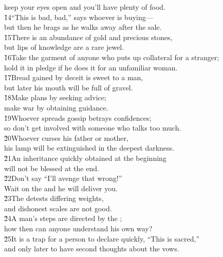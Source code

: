 \begin{poetry}
\poemll    keep your eyes open and you'll have plenty of food. \\
\poeml \v{14}``This is bad, bad,'' says whoever is buying--- \\
\poemll    but then he brags as he walks away after the sale. \\
\poeml \v{15}There is an abundance of gold and precious stones, \\
\poemll    but lips of knowledge are a rare jewel. \\
\poeml \v{16}Take the garment of anyone who puts up collateral for a stranger; \\
\poemll    hold it in pledge if he does it for an unfamiliar woman. \\
\poeml \v{17}Bread gained by deceit is sweet to a man, \\
\poemll    but later his mouth will be full of gravel. \\
\poeml \v{18}Make plans by seeking advice; \\
\poemll    make war by obtaining guidance. \\
\poeml \v{19}Whoever spreads gossip betrays confidences; \\
\poemll    so don't get involved with someone who talks too much. \\
\poeml \v{20}Whoever curses his father or mother, \\
\poemll    his lamp will be extinguished in the deepest darkness. \\
\poeml \v{21}An inheritance quickly obtained at the beginning \\
\poemll    will not be blessed at the end. \\
\poeml \v{22}Don't say ``I'll avenge that wrong!'' \\
\poemll    Wait on the  and he will deliver you. \\
\poeml \v{23}The  detests differing weights, \\
\poemll    and dishonest scales are not good. \\
\poeml \v{24}A man's steps are directed by the ; \\
\poemll    how then can anyone understand his own way? \\
\poeml \v{25}It is a trap for a person to declare quickly, ``This is sacred,'' \\
\poemll    and only later to have second thoughts about the vows. \\

\end{poetry}

